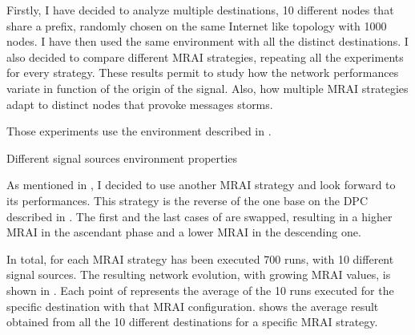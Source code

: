 Firstly, I have decided to analyze multiple destinations, \num{10}
different nodes that share a prefix, randomly chosen on the same Internet like
topology with \num{1000} nodes.
I have then used the same environment with all the distinct destinations.
I also decided to compare different \ac{MRAI} strategies, repeating all the experiments for
every strategy.
These results permit to study how the network performances variate in
function of the origin of the signal.
Also, how multiple \ac{MRAI} strategies adapt to distinct nodes that provoke
messages storms.

Those experiments use the environment described in .

\begin{table}[h]
	
	\caption{Different signal sources environment properties}
	\label{tbl:source_properties}
\end{table}

As mentioned in , I decided to use another
\ac{MRAI} strategy and look forward to its performances.
This strategy is the reverse of the one base on the \ac{DPC} described in
.
The first and the last cases of  are swapped, resulting in a
higher \ac{MRAI} in the ascendant phase and a lower \ac{MRAI} in the descending
one.

In total, for each \ac{MRAI} strategy has been executed \num{700} runs, with
\num{10} different signal sources.
The resulting network evolution, with growing \ac{MRAI} values, is shown in
.
Each point of  represents the average
of the \num{10} runs executed for the specific destination with that \ac{MRAI}
configuration.
 shows the average result
obtained from all the \num{10} different destinations for a specific \ac{MRAI}
strategy.


